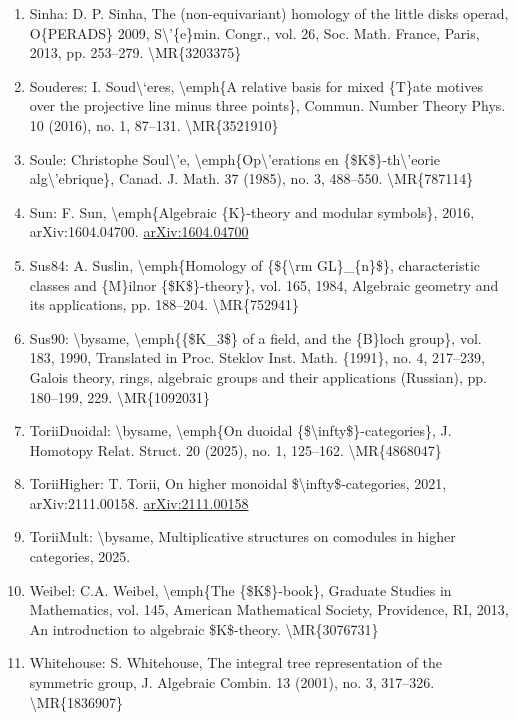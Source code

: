 \documentclass[11pt]{article}
\begin{document}
\begin{enumerate}[leftmargin=*]
  \item Sinha: D. P. Sinha, The (non-equivariant) homology of the little disks operad, O\{PERADS\} 2009, S\textbackslash{}'\{e\}min. Congr., vol. 26, Soc. Math. France, Paris, 2013, pp. 253--279. \textbackslash{}MR\{3203375\}
  \item Souderes: I. Soud\textbackslash{}`eres, \textbackslash{}emph\{A relative basis for mixed \{T\}ate motives over the projective line minus three points\}, Commun. Number Theory Phys. 10 (2016), no. 1, 87--131. \textbackslash{}MR\{3521910\}
  \item Soule: Christophe Soul\textbackslash{}'e, \textbackslash{}emph\{Op\textbackslash{}'erations en \{\$K\$\}-th\textbackslash{}'eorie alg\textbackslash{}'ebrique\}, Canad. J. Math. 37 (1985), no. 3, 488--550. \textbackslash{}MR\{787114\}
  \item Sun: F. Sun, \textbackslash{}emph\{Algebraic \{K\}-theory and modular symbols\}, 2016, arXiv:1604.04700. \href{https://arxiv.org/abs/1604.04700}{arXiv:1604.04700}
  \item Sus84: A. Suslin, \textbackslash{}emph\{Homology of \{\$\{\textbackslash{}rm GL\}\_\{n\}\$\}, characteristic classes and \{M\}ilnor \{\$K\$\}-theory\}, vol. 165, 1984, Algebraic geometry and its applications, pp. 188--204. \textbackslash{}MR\{752941\}
  \item Sus90: \textbackslash{}bysame, \textbackslash{}emph\{\{\$K\_3\$\} of a field, and the \{B\}loch group\}, vol. 183, 1990, Translated in Proc. Steklov Inst. Math. \{1991\}, no. 4, 217--239, Galois theory, rings, algebraic groups and their applications (Russian), pp. 180--199, 229. \textbackslash{}MR\{1092031\}
  \item ToriiDuoidal: \textbackslash{}bysame, \textbackslash{}emph\{On duoidal \{\$\textbackslash{}infty\$\}-categories\}, J. Homotopy Relat. Struct. 20 (2025), no. 1, 125--162. \textbackslash{}MR\{4868047\}
  \item ToriiHigher: T. Torii, On higher monoidal \$\textbackslash{}infty\$-categories, 2021, arXiv:2111.00158. \href{https://arxiv.org/abs/2111.00158}{arXiv:2111.00158}
  \item ToriiMult: \textbackslash{}bysame, Multiplicative structures on comodules in higher categories, 2025.
  \item Weibel: C.A. Weibel, \textbackslash{}emph\{The \{\$K\$\}-book\}, Graduate Studies in Mathematics, vol. 145, American Mathematical Society, Providence, RI, 2013, An introduction to algebraic \$K\$-theory. \textbackslash{}MR\{3076731\}
  \item Whitehouse: S. Whitehouse, The integral tree representation of the symmetric group, J. Algebraic Combin. 13 (2001), no. 3, 317--326. \textbackslash{}MR\{1836907\}

\end{enumerate}
\end{document}

